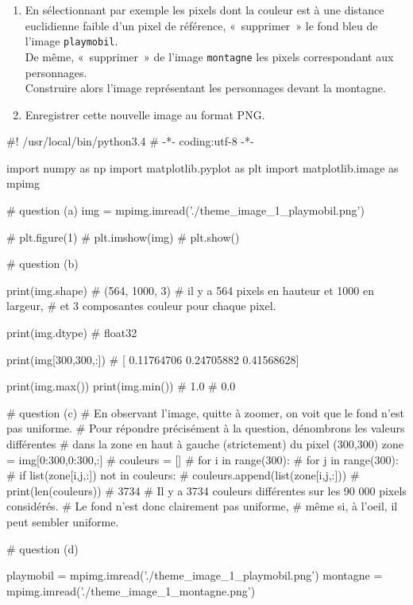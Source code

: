\documentclass[10pt,fleqn]{article} %
\begin{document}
\begin{multicols}{2}
\begin{enumerate}
\item
  En sélectionnant par exemple les pixels dont la couleur est à une
  distance euclidienne faible d'un pixel de référence, «~supprimer~»
  le fond bleu de l'image \texttt{playmobil}. \\
  De même, «~supprimer~» de
  l'image \texttt{montagne} les pixels correspondant aux personnages.\\
  Construire alors l'image représentant les personnages devant la
  montagne. 

\item
  Enregistrer cette nouvelle image au format PNG. 

\end{enumerate}
\fi

\ifprof
\begin{corrige}
\begin{python}
#! /usr/local/bin/python3.4
# -*- coding:utf-8 -*-
    
import numpy as np
import matplotlib.pyplot as plt
import matplotlib.image as mpimg

# question (a)
img = mpimg.imread('./theme_image_1_playmobil.png')  

# plt.figure(1)
# plt.imshow(img)
# plt.show()

# question (b)

print(img.shape)
# (564, 1000, 3)
# il y a 564 pixels en hauteur et 1000 en largeur,
# et 3 composantes couleur pour chaque pixel.
 
print(img.dtype)
# float32

print(img[300,300,:])
# [ 0.11764706  0.24705882  0.41568628]

print(img.max())
print(img.min())
# 1.0
# 0.0

# question (c)
# En observant l'image, quitte à zoomer, on voit que le fond n'est pas uniforme.
# Pour répondre précisément à la question, dénombrons les valeurs différentes
# dans la zone en haut à gauche (strictement) du pixel (300,300)
zone = img[0:300,0:300,:]
# couleurs = []
# for i in range(300):
#     for j in range(300):
#         if list(zone[i,j,:]) not in couleurs:
#             couleurs.append(list(zone[i,j,:]))
# print(len(couleurs))
# 3734
# Il y a 3734 couleurs différentes sur les 90 000 pixels considérés.
# Le fond n'est donc clairement pas uniforme,
# même si, à l'oeil, il peut sembler uniforme.

# question (d)

playmobil = mpimg.imread('./theme_image_1_playmobil.png')  
montagne = mpimg.imread('./theme_image_1_montagne.png')


\end{python}
\end{corrige}
\end{multicols}
\end{document}
